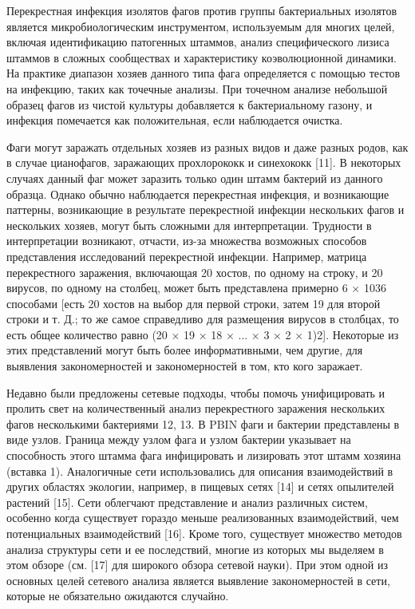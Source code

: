 \documentclass[a4paper,12pt]{article}
\begin{document}
    \par{Перекрестная инфекция изолятов фагов против группы бактериальных изолятов является микробиологическим
    инструментом, используемым для многих целей, включая идентификацию патогенных штаммов, анализ специфического лизиса
    штаммов в сложных сообществах и характеристику коэволюционной динамики. На практике диапазон хозяев данного типа
    фага определяется с помощью тестов на инфекцию, таких как точечные анализы. При точечном анализе небольшой образец
    фагов из чистой культуры добавляется к бактериальному газону, и инфекция помечается как положительная, если
    наблюдается очистка.}
    
    \par{Фаги могут заражать отдельных хозяев из разных видов и даже разных родов, как в случае цианофагов, заражающих
    прохлорококк и синехококк [11]. В некоторых случаях данный фаг может заразить только один штамм бактерий из данного
    образца. Однако обычно наблюдается перекрестная инфекция, и возникающие паттерны, возникающие в результате
    перекрестной инфекции нескольких фагов и нескольких хозяев, могут быть сложными для интерпретации. Трудности в
    интерпретации возникают, отчасти, из-за множества возможных способов представления исследований перекрестной
    инфекции. Например, матрица перекрестного заражения, включающая 20 хостов, по одному на строку, и 20 вирусов, по
    одному на столбец, может быть представлена примерно 6 × 1036 способами [есть 20 хостов на выбор для первой строки,
    затем 19 для второй строки и т. Д.; то же самое справедливо для размещения вирусов в столбцах, то есть общее
    количество равно (20 × 19 × 18 × ... × 3 × 2 × 1)2]. Некоторые из этих представлений могут быть более
    информативными, чем другие, для выявления закономерностей и закономерностей в том, кто кого заражает.}
    
    \par{Недавно были предложены сетевые подходы, чтобы помочь унифицировать и пролить свет на количественный анализ
    перекрестного заражения нескольких фагов несколькими бактериями 12, 13. В PBIN фаги и бактерии представлены в виде
    узлов. Граница между узлом фага и узлом бактерии указывает на способность этого штамма фага инфицировать и
    лизировать этот штамм хозяина (вставка 1). Аналогичные сети использовались для описания взаимодействий в других
    областях экологии, например, в пищевых сетях [14] и сетях опылителей растений [15]. Сети облегчают представление и
    анализ различных систем, особенно когда существует гораздо меньше реализованных взаимодействий, чем потенциальных
    взаимодействий [16]. Кроме того, существует множество методов анализа структуры сети и ее последствий, многие из
    которых мы выделяем в этом обзоре (см. [17] для широкого обзора сетевой науки). При этом одной из основных целей
    сетевого анализа является выявление закономерностей в сети, которые не обязательно ожидаются случайно.}
    
\end{document}
